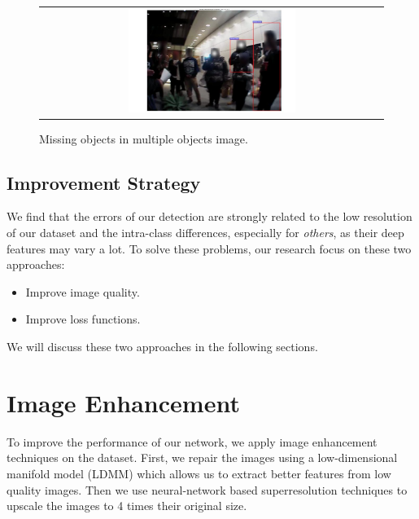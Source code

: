 \documentclass[a4paper]{article}
\begin{document}
\begin{figure}[H]
\begin{center}
\begin{tabular}{c}
\includegraphics[width=0.5\textwidth]{Missing_Detection_censored.jpg}\\
\end{tabular}
\end{center}
\caption{Missing objects in multiple objects image.}
\label{missing}
\end{figure}
\subsection{Improvement Strategy}
We find that the errors of our detection are strongly related to the low resolution of our dataset and the intra-class differences, especially for \textit{others}, as their deep features may vary a lot. To solve these problems, our research focus on these two approaches:
\begin{itemize}
\item { Improve image quality.}
\item { Improve loss functions.}
\end{itemize}
We will discuss these two approaches in the following sections.

\section{Image Enhancement}
To improve the performance of our network, we apply image enhancement techniques on the dataset. First, we repair the images using a low-dimensional manifold model (LDMM) which allows us to extract better features from low quality images. Then we use neural-network based superresolution techniques to upscale the images to 4 times their original size.
\end{document}
